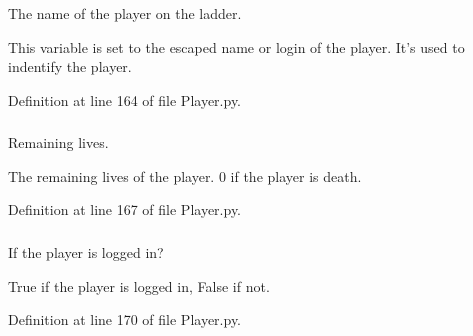 The name of the player on the ladder. 

This variable is set to the escaped name or login of the player. It's used to indentify the player. 

Definition at line 164 of file Player.py.

\hypertarget{class_player_1_1_player_ade041c5e2ed4966a35e6d548746ee6da}{
\subsubsection[{\_\-\_\-lives}]{}}
\label{class_player_1_1_player_ade041c5e2ed4966a35e6d548746ee6da}


Remaining lives. 

The remaining lives of the player. 0 if the player is death. 

Definition at line 167 of file Player.py.

\hypertarget{class_player_1_1_player_a040c3c6e90a7655064aa65adbb4387b6}{
\subsubsection[{\_\-\_\-logged\_\-in}]{}}
\label{class_player_1_1_player_a040c3c6e90a7655064aa65adbb4387b6}


If the player is logged in? 

True if the player is logged in, False if not. 

Definition at line 170 of file Player.py.

\hypertarget{class_player_1_1_player_a11f44d16220129d7efca52828dc13d4f}{
\subsubsection[{\_\-\_\-old\_\-ladder\_\-name}]{}}
\label{class_player_1_1_player_a11f44d16220129d7efca52828dc13d4f}


